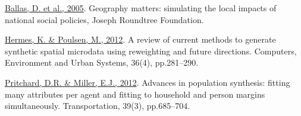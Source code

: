 \href{www.jrf.org.uk/sites/files/jrf/1859352669.pdf}{Ballas, D. et al.,
2005}. Geography matters: simulating the local impacts of national
social policies, Joseph Roundtree Foundation.

\href{http://linkinghub.elsevier.com/retrieve/pii/S0198971512000336}{Hermes,
K. \& Poulsen, M., 2012}. A review of current methods to generate
synthetic spatial microdata using reweighting and future directions.
Computers, Environment and Urban Systems, 36(4), pp.281--290.

\href{http://www.springerlink.com/index/10.1007/s11116-011-9367-4}{Pritchard,
D.R. \& Miller, E.J., 2012}. Advances in population synthesis: fitting
many attributes per agent and fitting to household and person margins
simultaneously. Transportation, 39(3), pp.685--704.


